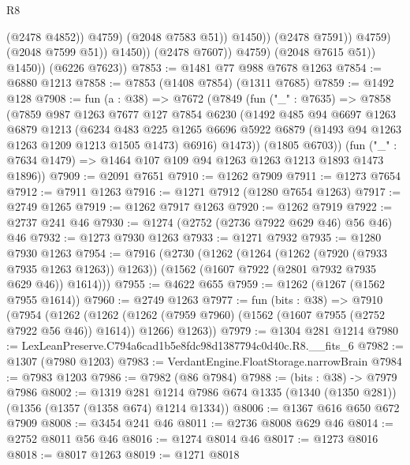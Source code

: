 \begin{lexlean}{R8}
\begin{coremodule}
                                    (@2478 @4852))
                                  @4759)
                                (@2048 @7583 @51))
                              @1450))
                          (@2478 @7591))
                        @4759)
                      (@2048 @7599 @51))
                    @1450))
                (@2478 @7607))
              @4759)
            (@2048 @7615 @51))
          @1450))
      (@6226 @7623))
@7853 := @1481 @77 @988 @7678 @1263
@7854 := @6880 @1213
@7858 := @7853 (@1408 @7854) (@1311 @7685)
@7859 := @1492 @128
@7908 := fun (a : @38) =>
  @7672
    (@7849
      (fun ("_" : @7635) =>
      @7858
        (@7859
          @987
          @1263
          @7677
          @127
          @7854
          @6230
          (@1492
            @485
            @94
            @6697
            @1263
            @6879
            @1213
            (@6234
              @483
              @225
              @1265
              @6696
              @5922
              @6879
              (@1493 @94 @1263 @1263 @1209 @1213 @1505 @1473)
              @6916)
            @1473))
        (@1805 @6703))
      (fun ("_" : @7634 @1479) => @1464 @107 @109 @94 @1263 @1263 @1213 @1893 @1473 @1896))
@7909 := @2091 @7651
@7910 := @1262 @7909
@7911 := @1273 @7654
@7912 := @7911 @1263
@7916 := @1271 @7912 (@1280 @7654 @1263)
@7917 := @2749 @1265
@7919 := @1262 @7917 @1263
@7920 := @1262 @7919
@7922 := @2737 @241 @46
@7930 := @1274 (@2752 (@2736 @7922 @629 @46) @56 @46) @46
@7932 := @1273 @7930 @1263
@7933 := @1271 @7932
@7935 := @1280 @7930 @1263
@7954 := @7916
    (@2730
      (@1262
        (@1264 (@1262 (@7920 (@7933 @7935 @1263 @1263)) @1263))
        (@1562 (@1607 @7922 (@2801 @7932 @7935 @629 @46)) @1614)))
@7955 := @4622 @655
@7959 := @1262 (@1267 (@1562 @7955 @1614))
@7960 := @2749 @1263
@7977 := fun (bits : @38) =>
  @7910
    (@7954
      (@1262
        (@1262 (@1262 (@7959 @7960) (@1562 (@1607 @7955 (@2752 @7922 @56 @46)) @1614)) @1266)
        @1263))
@7979 := @1304 @281 @1214
@7980 := LexLeanPreserve.C794a6cad1b5e8fdc98d1387794c0d40c.R8.__fits_6
@7982 := @1307 (@7980 @1203)
@7983 := VerdantEngine.FloatStorage.narrowBrain
@7984 := @7983 @1203
@7986 := @7982 (@86 @7984)
@7988 := (bits : @38) -> @7979 @7986
@8002 := @1319
    @281
    @1214
    @7986
    @674
    @1335
    (@1340 (@1350 @281))
    (@1356 (@1357 (@1358 @674) @1214 @1334))
@8006 := @1367 @616 @650 @672 @7909
@8008 := @3454 @241 @46
@8011 := @2736 @8008 @629 @46
@8014 := @2752 @8011 @56 @46
@8016 := @1274 @8014 @46
@8017 := @1273 @8016
@8018 := @8017 @1263
@8019 := @1271 @8018

\end{coremodule}
\end{lexlean}

